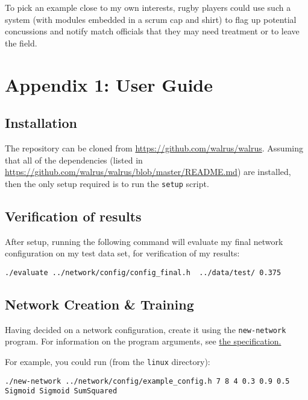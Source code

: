 \documentclass[a4paper]{article}
\begin{document}
To pick an example close to my own interests, rugby players could use such a system (with modules embedded in a scrum cap and shirt) to flag up potential concussions and notify match officials that they may need treatment or to leave the field.

\newpage
\section{Appendix 1: User Guide}
\label{sec:a1}

\subsection{Installation}%
\label{subsec:a1_installation}

The repository can be cloned from \url{https://github.com/walrus/walrus}. Assuming that all of the dependencies (listed in \url{https://github.com/walrus/walrus/blob/master/README.md}) are installed, then the only setup required is to run the \lstinline{setup} script.

\subsection{Verification of results}%

After setup, running the following command will evaluate my final network configuration on my test data set, for verification of my results:

\lstinline{./evaluate ../network/config/config_final.h  ../data/test/ 0.375}

\subsection{Network Creation \& Training}%
\label{subsec:a1_training}

Having decided on a network configuration, create it using the \lstinline{new-network} program. For information on the program arguments, see \hyperref[subsubsec:dc_csa_newnetwork]{the specification.}

For example, you could run (from the \lstinline{linux} directory):

\lstinline{./new-network ../network/config/example_config.h 7 8 4 0.3 0.9 0.5 Sigmoid Sigmoid SumSquared}
\end{document}
